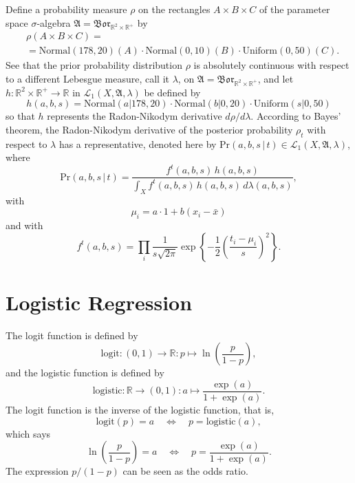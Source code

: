 \documentclass[
twoside=true,
paper=letter,
fontsize=11pt,
pagesize=auto,
leqno,
openany,
headsepline,
overfullrule,
]{scrbook}
\theoremstyle{plain}
\theoremstyle{plain}
\theoremstyle{definition}
\theoremstyle{bfnoteitalic}
\theoremstyle{bfnoteroman}
\newcommand{\sigalg}[1]{\mathfrak{#1}}
\newcommand{\cali}[1]{\mathscr{#1}}
\newcommand{\borel}{\mathfrak{Bor}}
\newcommand{\textsigma}{\hbox{\large{$\sigma$}}\kern-1pt}
\newcommand{\R}{\mathbb{R}}
\newcommand{\funcf}{f}
\newcommand{\funch}{h}
\newcommand{\function}{f}
\newcommand{\functioniii}{h}
\newcommand{\measurespace}{X}
\newcommand{\seti}{A}
\newcommand{\setii}{B}
\newcommand{\setiii}{C}
\newcommand{\pspace}{\measurespace}%
\newcommand{\pspacesig}{\sigalg{A}}
\begin{document}
Define a probability measure $\rho$ on the rectangles 
$\seti\times\setii\times\setiii$ of the parameter space \textsigma-algebra 
$\pspacesig=\borel_{\R^2\times\R^+}$ by
\begin{align*}
& \rho(\seti\times\setii\times\setiii) =
\\
& =
\text{Normal}(178,20)(\seti)\cdot
\text{Normal}(0,10)(\setii)\cdot
\text{Uniform}(0,50)(\setiii).
\end{align*}
See that the prior probability distribution $\rho$ is absolutely continuous with respect to a different Lebesgue measure, call it
$\lambda$, on $\pspacesig=\borel_{\R^2\times\R^+}$,
and let
$\funch:\R^2\times\R^+\to\R$ in
$\cali{L}_1(\pspace,\pspacesig,\lambda)$ be defined by
\[
\funch (a,b,s) =
\text{Normal}(a\vert 178,20)\cdot
\text{Normal}(b\vert 0,20)\cdot
\text{Uniform}(s\vert 0,50)
\]
so that $\functioniii$ represents the Radon-Nikodym derivative $d\rho/d\lambda$.
According to Bayes' theorem, the Radon-Nikodym derivative of the posterior probability 
$\rho_{t}$ with respect to $\lambda$ has a representative, denoted here by
$\text{Pr}(a,b,s\,\vert\, t)\in\cali{L}_1(\pspace, \pspacesig,\lambda)$,
where 
\[
\text{Pr}(a,b,s\,\vert\, t)
=
\frac{\function^{t}(a,b,s)\,\functioniii(a,b,s)}
{\int_{\pspace}\function^{t}(a,b,s)\,\functioniii(a,b,s)\,d\lambda(a,b,s)},
\]
with 
\[
\mu_i=a\cdot 1 + b(x_i-\bar x)
\]
and with
\[
\funcf^t(a,b,s) =
\prod_i
\frac{1}{s\sqrt{2\pi}}
\exp
\left\{
-\frac{1}{2}
\left(
\frac{t_i-\mu_i}{s}
\right)^2
\right\}.
\]




\section{Logistic Regression}\label{logistic_regression}
The logit function is defined by
\[
\text{logit} : (0,1) \to \R: p\mapsto \ln\left( \frac{p}{1-p} \right),
\]
and the logistic function is defined by
\[
\text{logistic}:\R\to (0,1): a\mapsto  \frac{\exp(a)}{1+\exp(a)}.
\]
The logit function is the inverse of the logistic function, that is,
\[
\text{logit}(p)=a \quad \Leftrightarrow \quad 
p = \text{logistic}(a),
\]
which says
\[
\ln\left( \frac{p}{1-p} \right) = a \quad
\Leftrightarrow \quad 
p = \frac{\exp(a)}{1+\exp(a)}.
\]
The expression
$p/(1-p)$
can be seen as the odds ratio.
\end{document}
